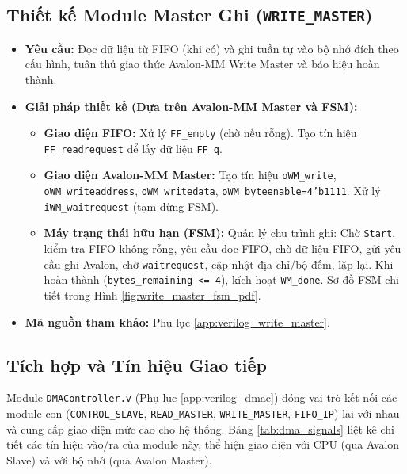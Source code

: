 \subsection{Thiết kế Module Master Ghi (\texttt{WRITE\_MASTER})}
\begin{itemize}
    \item \textbf{Yêu cầu:} Đọc dữ liệu từ FIFO (khi có) và ghi tuần tự vào bộ nhớ đích theo cấu hình, tuân thủ giao thức Avalon-MM Write Master và báo hiệu hoàn thành.
    \item \textbf{Giải pháp thiết kế (Dựa trên Avalon-MM Master và FSM):}
        \begin{itemize}
            \item \textbf{Giao diện FIFO:} Xử lý \texttt{FF\_empty} (chờ nếu rỗng). Tạo tín hiệu \texttt{FF\_readrequest} để lấy dữ liệu \texttt{FF\_q}.
            \item \textbf{Giao diện Avalon-MM Master:} Tạo tín hiệu \texttt{oWM\_write}, \texttt{oWM\_writeaddress}, \texttt{oWM\_writedata}, \texttt{oWM\_byteenable=4'b1111}. Xử lý \texttt{iWM\_waitrequest} (tạm dừng FSM).
            \item \textbf{Máy trạng thái hữu hạn (FSM):} Quản lý chu trình ghi: Chờ \texttt{Start}, kiểm tra FIFO không rỗng, yêu cầu đọc FIFO, chờ dữ liệu FIFO, gửi yêu cầu ghi Avalon, chờ \texttt{waitrequest}, cập nhật địa chỉ/bộ đếm, lặp lại. Khi hoàn thành (\texttt{bytes\_remaining <= 4}), kích hoạt \texttt{WM\_done}. Sơ đồ FSM chi tiết trong Hình \ref{fig:write_master_fsm_pdf}.
        \end{itemize}
    \item \textbf{Mã nguồn tham khảo:} Phụ lục \ref{app:verilog_write_master}.
\end{itemize}

\subsection{Tích hợp và Tín hiệu Giao tiếp}
Module \texttt{DMAController.v} (Phụ lục \ref{app:verilog_dmac}) đóng vai trò kết nối các module con (\texttt{CONTROL\_SLAVE}, \texttt{READ\_MASTER}, \texttt{WRITE\_MASTER}, \texttt{FIFO\_IP}) lại với nhau và cung cấp giao diện mức cao cho hệ thống. Bảng \ref{tab:dma_signals} liệt kê chi tiết các tín hiệu vào/ra của module này, thể hiện giao diện với CPU (qua Avalon Slave) và với bộ nhớ (qua Avalon Master).

